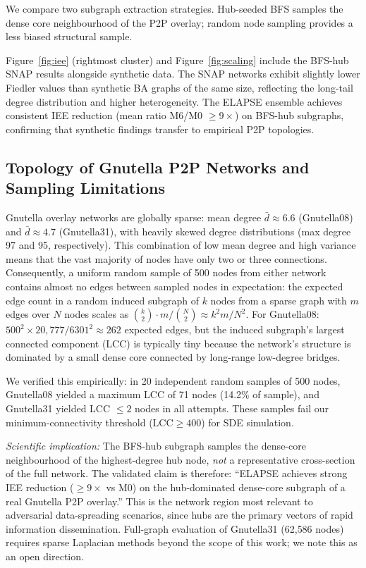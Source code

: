 \documentclass[review,12pt]{elsarticle}
\begin{document}
We compare two subgraph extraction strategies. Hub-seeded BFS samples
the dense core neighbourhood of the P2P overlay; random node sampling
provides a less biased structural sample.

Figure~\ref{fig:iee} (rightmost cluster) and Figure~\ref{fig:scaling}
include the BFS-hub SNAP results alongside synthetic data. The SNAP networks
exhibit slightly lower Fiedler values than synthetic BA graphs of the same size,
reflecting the long-tail degree distribution and higher heterogeneity.
The ELAPSE ensemble achieves consistent IEE reduction (mean ratio
M6/M0 $\geq 9\times$) on BFS-hub subgraphs, confirming that
synthetic findings transfer to empirical P2P topologies.

\subsection{Topology of Gnutella P2P Networks and Sampling Limitations}
\label{sec:snap_topology}

Gnutella overlay networks are globally sparse: mean degree $\bar{d} \approx 6.6$
(Gnutella08) and $\bar{d} \approx 4.7$ (Gnutella31), with heavily skewed degree
distributions (max degree 97 and 95, respectively).
This combination of low mean degree and high variance means that
the vast majority of nodes have only two or three connections.
Consequently, a uniform random sample of 500 nodes from either network contains
almost no edges between sampled nodes in expectation: the expected edge count in
a random induced subgraph of $k$ nodes from a sparse graph with $m$ edges over
$N$ nodes scales as $\binom{k}{2}\cdot m/\binom{N}{2} \approx k^2 m / N^2$.
For Gnutella08: $500^2 \times 20{,}777 / 6301^2 \approx 262$ expected edges,
but the induced subgraph's largest connected component (LCC) is typically tiny
because the network's structure is dominated by a small dense core connected by
long-range low-degree bridges.

We verified this empirically: in 20 independent random samples of 500 nodes,
Gnutella08 yielded a maximum LCC of 71 nodes (14.2\% of sample),
and Gnutella31 yielded LCC $\leq 2$ nodes in all attempts.
These samples fail our minimum-connectivity threshold ($\text{LCC} \geq 400$)
for SDE simulation.

\emph{Scientific implication:} The BFS-hub subgraph samples the dense-core
neighbourhood of the highest-degree hub node, \emph{not} a representative
cross-section of the full network.  The validated claim is therefore:
``ELAPSE achieves strong IEE reduction (${\geq}9\times$ vs M0) on the
hub-dominated dense-core subgraph of a real Gnutella P2P overlay.''
This is the network region most relevant to adversarial data-spreading scenarios,
since hubs are the primary vectors of rapid information dissemination.
Full-graph evaluation of Gnutella31 (62{,}586 nodes) requires sparse Laplacian
methods beyond the scope of this work; we note this as an open direction.
\end{document}
